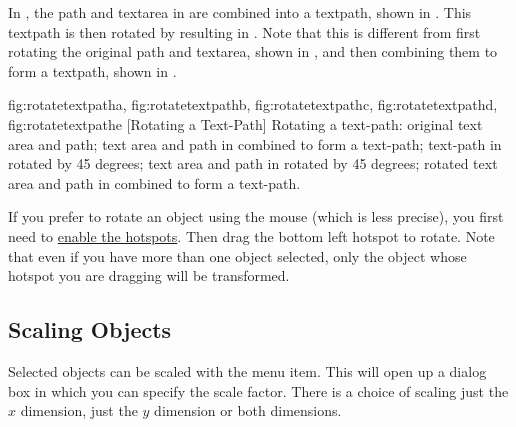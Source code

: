 In , the \gls*{path} and
\gls*{textarea} in  are
combined into a \gls*{textpath}, shown in
. This \gls*{textpath} is then
rotated by  resulting in
. Note that this is different
from first rotating the original \gls*{path} and \gls*{textarea},
shown in , and then combining
them to form a \gls*{textpath}, shown in
.

{
 {fig:rotatetextpatha}{}{},
 {fig:rotatetextpathb}{}{},
 {fig:rotatetextpathc}{}{},
 {fig:rotatetextpathd}{}{},
 {fig:rotatetextpathe}{}{}
}
[Rotating a Text-Path]
{Rotating a text-path: 
 original text area and path; 
 text area and path in
 combined to form a text-path;
 text-path in
 rotated by 45 degrees;
 text area and path in
 rotated by 45 degrees;
 rotated text area and
path in  combined to form a text-path.}

If you prefer to rotate an \gls{object} using the mouse (which is
less precise), you first need to \hyperref[mi:hotspots]{enable the hotspots}.
Then drag the bottom left hotspot to rotate. Note that even if you
have more than one object selected, only the object whose hotspot you
are dragging will be transformed.



\subsection{Scaling Objects}\label{sec:scaleobjects}


Selected \glspl{object} can be scaled with the
 menu item. This will open up a dialog box
in which you can specify the scale factor. There is a choice of
scaling just the $x$ dimension, just the $y$ dimension
or both dimensions.

